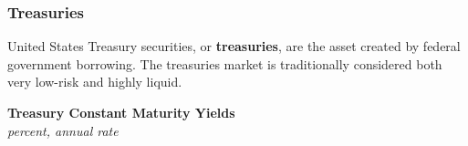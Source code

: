 \documentclass{report}
\begin{document}
{\begin{minipage}{0.76\textwidth}
\subsubsection*{Treasuries}
\small United States Treasury securities, or \textbf{treasuries}, are the asset created by federal government borrowing. The treasuries market is traditionally considered both very low-risk and highly liquid. 

 
\end{minipage}
\vspace{1mm}

\begin{minipage}{0.98\textwidth}
\normalsize \textbf{Treasury Constant Maturity Yields}\\
\footnotesize{\textit{percent, annual rate}}
\vspace{3.8cm}


\end{minipage}}
\end{document}
